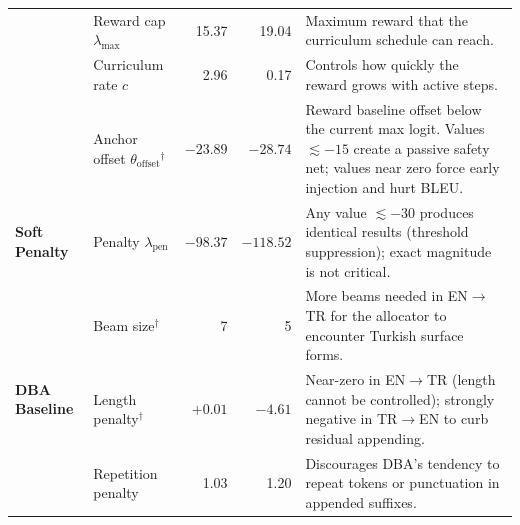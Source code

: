 \documentclass{tlp}
\begin{document}
\begin{table}[htbp]
{\begin{tabular}{llrrp{3.5cm}}
        & Reward cap $\lambda_{\text{max}}$ & 15.37 & 19.04
          & Maximum reward that the curriculum schedule can reach. \\
        & Curriculum rate $c$ & 2.96 & 0.17
          & Controls how quickly the reward grows with active steps. \\
        & Anchor offset $\theta_{\text{offset}}$$^\dagger$ & $-23.89$ & $-28.74$
          & Reward baseline offset below the current max logit. Values
            $\lesssim{-}15$ create a passive safety net; values near zero
            force early injection and hurt BLEU. \\
      \midrule
      \multirow{1}{*}{\textbf{Soft Penalty}}
        & Penalty $\lambda_{\text{pen}}$ & $-98.37$ & $-118.52$
          & Any value $\lesssim{-}30$ produces identical results (threshold
            suppression); exact magnitude is not critical. \\
      \midrule
      \multirow{3}{*}{\textbf{DBA Baseline}}
        & Beam size$^\dagger$ & 7 & 5
          & More beams needed in EN$\rightarrow$TR for the allocator to
            encounter Turkish surface forms. \\
        & Length penalty$^\dagger$ & $+0.01$ & $-4.61$
          & Near-zero in EN$\rightarrow$TR (length cannot be controlled);
            strongly negative in TR$\rightarrow$EN to curb residual appending. \\
        & Repetition penalty & 1.03 & 1.20
          & Discourages DBA's tendency to repeat tokens or punctuation in
            appended suffixes. \\
      \bottomrule
    \end{tabular}
  }
\end{table}
\end{document}
